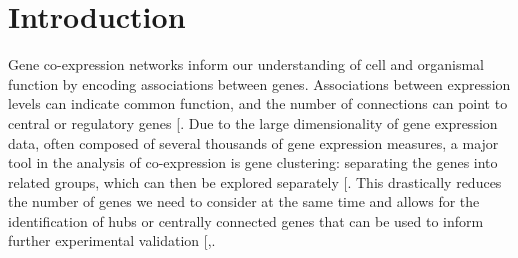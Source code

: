 \documentclass[
]{article}
\begin{document}
\newpage

\section{Introduction}\label{introduction}

\linenumbers
\doublespacing

Gene co-expression networks inform our understanding of cell and
organismal function by encoding associations between genes. Associations
between expression levels can indicate common function, and the number
of connections can point to central or regulatory genes
{[}\citeproc{ref-Van_Dam2018-nf}{1}{]}. Due to the large dimensionality
of gene expression data, often composed of several thousands of gene
expression measures, a major tool in the analysis of co-expression is
gene clustering: separating the genes into related groups, which can
then be explored separately {[}\citeproc{ref-Dhaeseleer2005-jv}{2}{]}.
This drastically reduces the number of genes we need to consider at the
same time and allows for the identification of hubs or centrally
connected genes that can be used to inform further experimental
validation
{[},\citeproc{ref-Imenez_Silva2017-ic}{4}{]}.
\end{document}
